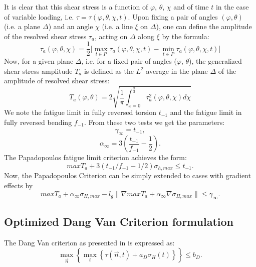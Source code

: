 \documentclass[3p,times,procedia,number]{elsarticle}
\begin{document}
It is clear that this shear stress is a function of
$\varphi$, $\theta$, $\chi$ and of time $t$ in the case of variable loading, i.e. $\tau=\tau(\varphi, \theta, \chi, t)$. Upon fixing a pair of angles $(\varphi, \theta)$ (i.e. a plane
$\Delta$) and an angle $\chi$ (i.e. a line $\xi$ on $\Delta$), one can define the amplitude of the resolved shear stress $\tau_a$, acting on $\Delta$
along $\xi$ by the formula:
\begin{equation}
\tau_a(\varphi,\theta,\chi)=\dfrac{1}{2}\big[\max \limits_{t\in P}\tau_a(\varphi,\theta,\chi ,t)-\min \limits_{t\in P}\tau_a(\varphi,\theta,\chi ,t)\big]
\end{equation}
Now, for a given plane $\Delta$, i.e. for a fixed pair of angles ($\varphi$, $\theta$),
the generalized shear stress amplitude $T_a$ is defined as the $L^2$ average in the plane $\Delta$ of the amplitude of resolved shear stress:
\begin{equation}
T_a(\varphi,\theta)=2\sqrt{\dfrac{1}{\pi}\int_{x=0}^{\frac{\pi}{2}} \tau_a^2(\varphi,\theta,\chi)d\chi}
\label{Ta}
\end{equation}
We note the fatigue limit in fully reversed torsion $t_{-1}$ and the fatigue limit in fully reversed bending $f_{-1}$. From these two tests we get the parameters:
$$\gamma_\infty=t_{-1},$$ 
$$\alpha_\infty=3\left( \dfrac{t_{-1}}{f_{-1}}-\dfrac{1}{2}\right) .$$
The Papadopoulos fatigue limit criterion achieves the form:
\begin{equation}
maxT_a+3\left( t_{-1}/f_{-1}-1/2\right) \sigma_{h,max}\leqslant t_{-1}.
\label{eq:papadopoulos}
\end{equation}
Now,  the Papadopoulos Criterion can be simply extended  to cases with gradient effects by
\begin{equation}
maxT_a+\alpha_\infty\sigma_{H,max}-l_g\parallel\nabla{maxT_a}+\alpha_\infty\nabla\sigma_{H,max}\parallel\leqslant \gamma_\infty .
\label{eq:modified papa}
\end{equation}

\subsection{Optimized Dang Van Criterion formulation}
The Dang Van criterion as presented in \cite{ballard1995high} is expressed as:
\begin{equation}
\max \limits_{\vec{n}}\left\lbrace \max \limits_{t}\left\{\tau{(\vec{n},t)}+a_D\sigma_H(t)\right\}\right\rbrace \leqslant b_D.
\label{dv}
\end{equation}
\end{document}
